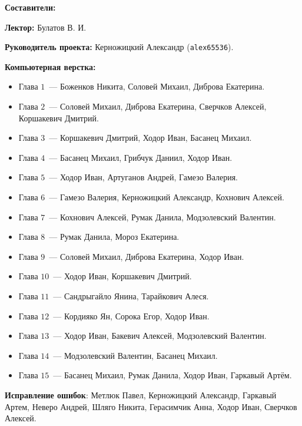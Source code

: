 \documentclass[../main.tex]{subfiles}
\begin{document}
 

{\Huge \bf Составители:}

\vspace{2em}

{
    \textbf{Лектор:} Булатов В. И.
    
    \smallskip
    
    \textbf{Руководитель проекта:} Керножицкий Александр 
    (\texttt{alex65536}).
    
    \smallskip
    
    \textbf{Компьютерная верстка:}
    \begin{itemize}
     \item Глава $1$~--- Боженков Никита, Соловей Михаил, Диброва Екатерина.
     \item Глава $2$~--- Соловей Михаил, Диброва Екатерина, Сверчков Алексей,
     Коршакевич Дмитрий.
     \item Глава $3$~--- Коршакевич Дмитрий, Ходор Иван, Басанец Михаил.
     \item Глава $4$~--- Басанец Михаил, Грибчук Даниил, Ходор Иван.
     \item Глава $5$~--- Ходор Иван, Артуганов Андрей, Гамезо Валерия.
     \item Глава $6$~--- Гамезо Валерия, Керножицкий Александр,
     Кохнович Алексей.
     \item Глава $7$~--- Кохнович Алексей, Румак Данила, Модзолевский Валентин.
     \item Глава $8$~--- Румак Данила, Мороз Екатерина.
     \item Глава $9$~--- Соловей Михаил, Диброва Екатерина, Ходор Иван.
     \item Глава $10$~--- Ходор Иван, Коршакевич Дмитрий.
     \item Глава $11$~--- Сандрыгайло Янина, Тарайкович Алеся.
     \item Глава $12$~--- Кордияко Ян, Сорока Егор, Ходор Иван.
     \item Глава $13$~--- Ходор Иван, Бакевич Алексей, Модзолевский Валентин.
     \item Глава $14$~--- Модзолевский Валентин, Басанец Михаил.
     \item Глава $15$~--- Басанец Михаил, Румак Данила, Ходор Иван, Гаркавый Артём.
    \end{itemize}
    
    \textbf{Исправление ошибок}: Метлюк Павел, Керножицкий Александр, Гаркавый
    Артем, Неверо Андрей, Шляго Никита, Герасимчик Анна, Ходор Иван,
    Сверчков Алексей.
    
}
\end{document}
